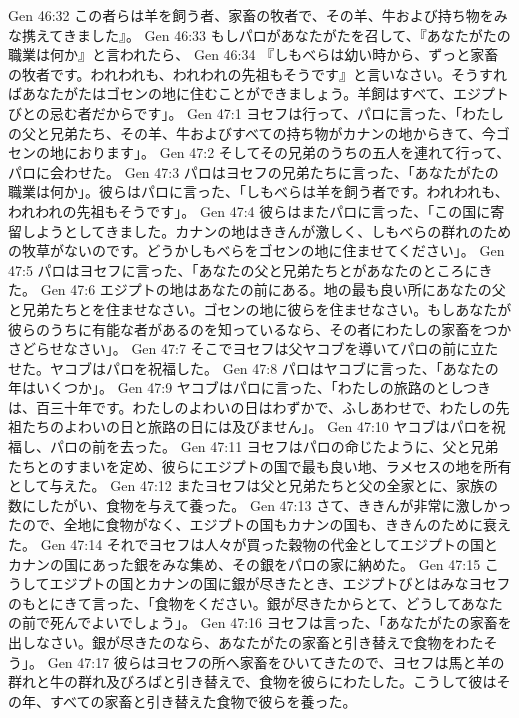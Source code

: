 Gen 46:32  この者らは羊を飼う者、家畜の牧者で、その羊、牛および持ち物をみな携えてきました』。
Gen 46:33  もしパロがあなたがたを召して、『あなたがたの職業は何か』と言われたら、
Gen 46:34  『しもべらは幼い時から、ずっと家畜の牧者です。われわれも、われわれの先祖もそうです』と言いなさい。そうすればあなたがたはゴセンの地に住むことができましょう。羊飼はすべて、エジプトびとの忌む者だからです」。
Gen 47:1  ヨセフは行って、パロに言った、「わたしの父と兄弟たち、その羊、牛およびすべての持ち物がカナンの地からきて、今ゴセンの地におります」。
Gen 47:2  そしてその兄弟のうちの五人を連れて行って、パロに会わせた。
Gen 47:3  パロはヨセフの兄弟たちに言った、「あなたがたの職業は何か」。彼らはパロに言った、「しもべらは羊を飼う者です。われわれも、われわれの先祖もそうです」。
Gen 47:4  彼らはまたパロに言った、「この国に寄留しようとしてきました。カナンの地はききんが激しく、しもべらの群れのための牧草がないのです。どうかしもべらをゴセンの地に住ませてください」。
Gen 47:5  パロはヨセフに言った、「あなたの父と兄弟たちとがあなたのところにきた。
Gen 47:6  エジプトの地はあなたの前にある。地の最も良い所にあなたの父と兄弟たちとを住ませなさい。ゴセンの地に彼らを住ませなさい。もしあなたが彼らのうちに有能な者があるのを知っているなら、その者にわたしの家畜をつかさどらせなさい」。
Gen 47:7  そこでヨセフは父ヤコブを導いてパロの前に立たせた。ヤコブはパロを祝福した。
Gen 47:8  パロはヤコブに言った、「あなたの年はいくつか」。
Gen 47:9  ヤコブはパロに言った、「わたしの旅路のとしつきは、百三十年です。わたしのよわいの日はわずかで、ふしあわせで、わたしの先祖たちのよわいの日と旅路の日には及びません」。
Gen 47:10  ヤコブはパロを祝福し、パロの前を去った。
Gen 47:11  ヨセフはパロの命じたように、父と兄弟たちとのすまいを定め、彼らにエジプトの国で最も良い地、ラメセスの地を所有として与えた。
Gen 47:12  またヨセフは父と兄弟たちと父の全家とに、家族の数にしたがい、食物を与えて養った。
Gen 47:13  さて、ききんが非常に激しかったので、全地に食物がなく、エジプトの国もカナンの国も、ききんのために衰えた。
Gen 47:14  それでヨセフは人々が買った穀物の代金としてエジプトの国とカナンの国にあった銀をみな集め、その銀をパロの家に納めた。
Gen 47:15  こうしてエジプトの国とカナンの国に銀が尽きたとき、エジプトびとはみなヨセフのもとにきて言った、「食物をください。銀が尽きたからとて、どうしてあなたの前で死んでよいでしょう」。
Gen 47:16  ヨセフは言った、「あなたがたの家畜を出しなさい。銀が尽きたのなら、あなたがたの家畜と引き替えで食物をわたそう」。
Gen 47:17  彼らはヨセフの所へ家畜をひいてきたので、ヨセフは馬と羊の群れと牛の群れ及びろばと引き替えで、食物を彼らにわたした。こうして彼はその年、すべての家畜と引き替えた食物で彼らを養った。
